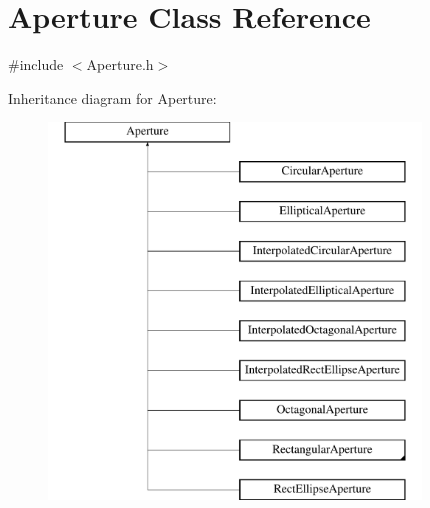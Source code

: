 \hypertarget{classAperture}{}\section{Aperture Class Reference}
\label{classAperture}


{\ttfamily \#include $<$Aperture.\+h$>$}

Inheritance diagram for Aperture\+:\begin{figure}[H]
\begin{center}
\leavevmode
\includegraphics[height=10.000000cm]{classAperture}
\end{center}
\end{figure}
